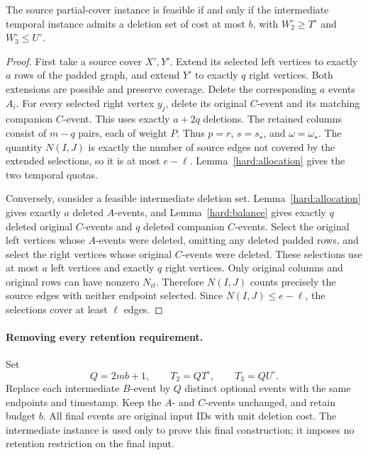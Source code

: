 \begin{lemma}
\label{hard:retained-equivalence}
The source partial-cover instance is feasible if and only if the
intermediate temporal instance admits a deletion set of cost at most
\(b\), with \(W_2^\circ\ge T^\circ\) and \(W_3^\circ\le U^\circ\).
\end{lemma}

\begin{proof}
First take a source cover \(X',Y'\). Extend its selected left vertices to
exactly \(a\) rows of the padded graph, and extend \(Y'\) to exactly \(q\)
right vertices. Both extensions are possible and preserve coverage.
Delete the corresponding \(a\) events \(A_i\). For every selected right
vertex \(y_j\), delete its original \(C\)-event and its matching companion
\(C\)-event. This uses exactly \(a+2q\) deletions.
The retained columns consist of \(m-q\) pairs, each of weight \(P\).
Thus \(p=r\), \(s=s_\star\), and \(\omega=\omega_\star\).
The quantity \(N(I,J)\) is exactly the number of source edges not covered
by the extended selections, so it is at most \(e-\ell\).
Lemma~\ref{hard:allocation} gives the two temporal quotas.

Conversely, consider a feasible intermediate deletion set.
Lemma~\ref{hard:allocation} gives exactly \(a\) deleted \(A\)-events, and
Lemma~\ref{hard:balance} gives exactly \(q\) deleted original \(C\)-events
and \(q\) deleted companion \(C\)-events. Select the original left vertices
whose \(A\)-events were deleted, omitting any deleted padded rows, and
select the right vertices whose original \(C\)-events were deleted.
These selections use at most \(a\) left vertices and exactly \(q\) right
vertices. Only original columns and original rows can have nonzero
\(N_{it}\). Therefore \(N(I,J)\) counts precisely the source edges with
neither endpoint selected. Since \(N(I,J)\le e-\ell\), the selections
cover at least \(\ell\) edges.
\end{proof}

\paragraph{Removing every retention requirement.}
Set
\begin{equation}
\label{hard:replication-parameters}
 Q=2mb+1,\qquad T_2=QT^\circ,\qquad T_3=QU^\circ.
\end{equation}
Replace each intermediate \(B\)-event by \(Q\) distinct optional events
with the same endpoints and timestamp. Keep the \(A\)- and \(C\)-events
unchanged, and retain budget \(b\). All final events are original input
IDs with unit deletion cost. The intermediate instance is used only to
prove this final construction; it imposes no retention restriction on the
final input.

